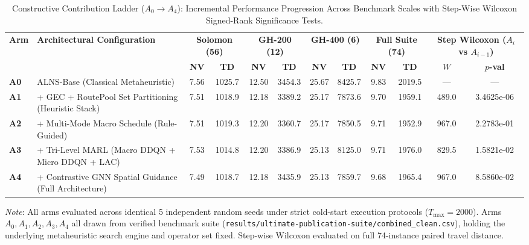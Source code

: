 \begin{table}[!t]
\caption{Constructive Contribution Ladder ($A_0 \to A_4$): Incremental Performance Progression Across Benchmark Scales with Step-Wise Wilcoxon Signed-Rank Significance Tests.}
\label{tab:constructive_ladder}
\centering
\footnotesize
\setlength{\tabcolsep}{2.5pt}
\begin{tabular*}{\textwidth}{@{\extracolsep{\fill}} l l cc cc cc cc cc @{}}
\toprule
\multirow{2}{*}{\textbf{Arm}} & \multirow{2}{*}{\textbf{Architectural Configuration}} & \multicolumn{2}{c}{\textbf{Solomon (56)}} & \multicolumn{2}{c}{\textbf{GH-200 (12)}} & \multicolumn{2}{c}{\textbf{GH-400 (6)}} & \multicolumn{2}{c}{\textbf{Full Suite (74)}} & \multicolumn{2}{c}{\textbf{Step Wilcoxon ($A_i$ vs $A_{i-1}$)}} \\
\cmidrule(lr){3-4} \cmidrule(lr){5-6} \cmidrule(lr){7-8} \cmidrule(lr){9-10} \cmidrule(lr){11-12}
 & & \textbf{NV} & \textbf{TD} & \textbf{NV} & \textbf{TD} & \textbf{NV} & \textbf{TD} & \textbf{NV} & \textbf{TD} & $W$ & $p$\textbf{-val} \\
\midrule
\textbf{A0} & ALNS-Base (Classical Metaheuristic) & 7.56 & 1025.7 & 12.50 & 3454.3 & 25.67 & 8425.7 & 9.83 & 2019.5 & --- & --- \\
\textbf{A1} & + GEC + RoutePool Set Partitioning (Heuristic Stack) & 7.51 & 1018.9 & 12.18 & 3389.2 & 25.17 & 7873.6 & 9.70 & 1959.1 & 489.0 & 3.4625e-06 \\
\textbf{A2} & + Multi-Mode Macro Schedule (Rule-Guided) & 7.51 & 1019.3 & 12.20 & 3360.7 & 25.17 & 7850.5 & 9.71 & 1952.9 & 967.0 & 2.2783e-01 \\
\textbf{A3} & + Tri-Level MARL (Macro DDQN + Micro DDQN + LAC) & 7.53 & 1014.8 & 12.20 & 3386.9 & 25.13 & 8125.0 & 9.71 & 1976.0 & 829.5 & 1.5821e-02 \\
\textbf{A4} & + Contrastive GNN Spatial Guidance (Full Architecture) & 7.49 & 1018.7 & 12.18 & 3435.9 & 25.13 & 7859.7 & 9.68 & 1965.4 & 967.0 & 8.5860e-02 \\
\bottomrule
\end{tabular*}
{\raggedright \footnotesize \textit{Note}: All arms evaluated across identical 5 independent random seeds under strict cold-start execution protocols ($T_{\max}=2000$). Arms $A_0, A_1, A_2, A_3, A_4$ all drawn from verified benchmark suite (\texttt{results/ultimate-publication-suite/combined\_clean.csv}), holding the underlying metaheuristic search engine and operator set fixed. Step-wise Wilcoxon evaluated on full 74-instance paired travel distance.\par}
\end{table}
